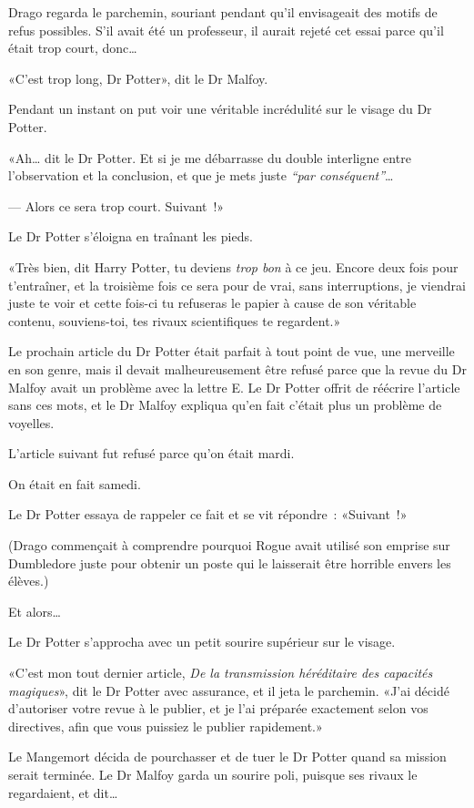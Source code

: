 Drago regarda le parchemin, souriant pendant qu'il envisageait des motifs de refus possibles. S'il avait été un professeur, il aurait rejeté cet essai parce qu'il était trop court, donc…

«C'est trop long, Dr Potter», dit le Dr Malfoy.

Pendant un instant on put voir une véritable incrédulité sur le visage du Dr Potter.

«Ah… dit le Dr Potter. Et si je me débarrasse du double interligne entre l'observation et la conclusion, et que je mets juste \emph{“par conséquent”}…

--- Alors ce sera trop court. Suivant~!»

Le Dr Potter s'éloigna en traînant les pieds.

«Très bien, dit Harry Potter, tu deviens \emph{trop bon} à ce jeu. Encore deux fois pour t'entraîner, et la troisième fois ce sera pour de vrai, sans interruptions, je viendrai juste te voir et cette fois-ci tu refuseras le papier à cause de son véritable contenu, souviens-toi, tes rivaux scientifiques te regardent.»

Le prochain article du Dr Potter était parfait à tout point de vue, une merveille en son genre, mais il devait malheureusement être refusé parce que la revue du Dr Malfoy avait un problème avec la lettre E\@. Le Dr Potter offrit de réécrire l'article sans ces mots, et le Dr Malfoy expliqua qu'en fait c'était plus un problème de voyelles.

L'article suivant fut refusé parce qu'on était mardi.

On était en fait samedi.

Le Dr Potter essaya de rappeler ce fait et se vit répondre~: «Suivant~!»

(Drago commençait à comprendre pourquoi Rogue avait utilisé son emprise sur Dumbledore juste pour obtenir un poste qui le laisserait être horrible envers les élèves.)

Et alors…

Le Dr Potter s'approcha avec un petit sourire supérieur sur le visage.

«C'est mon tout dernier article, \emph{De la transmission héréditaire des capacités magiques}», dit le Dr Potter avec assurance, et il jeta le parchemin. «J'ai décidé d'autoriser votre revue à le publier, et je l'ai préparée exactement selon vos directives, afin que vous puissiez le publier rapidement.»

Le Mangemort décida de pourchasser et de tuer le Dr Potter quand sa mission serait terminée. Le Dr Malfoy garda un sourire poli, puisque ses rivaux le regardaient, et dit…

